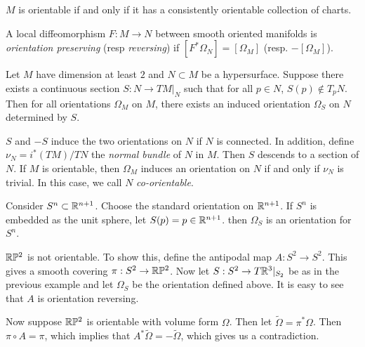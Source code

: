 \documentclass[twoside, 10pt]{article}
\begin{document}
    \begin{exer} $M$ is orientable if and only if it has a
    consistently orientable collection of charts.  \end{exer}

    \begin{defn} A local diffeomorphism $F:M \to N$ between smooth oriented
    manifolds is \textit{orientation preserving} (resp \textit{reversing}) if
$[F^*\Omega_N] = [\Omega_M]$ (resp. $-[\Omega_M]$).  \end{defn}

    \begin{prop} Let $M$ have dimension at least $2$ and $N \subset M$ be a
        hypersurface. Suppose there exists a continuous section $S: N \to
        TM|_N$ such that for all $p \in N$, $S(p) \notin T_pN$. Then for all
        orientations $\Omega_M$ on $M$, there exists an induced orientation
        $\Omega_S$ on $N$ determined by $S$.  \end{prop}

    \begin{rmk} $S$ and $-S$ induce the two orientations on $N$ if $N$ is
        connected. In addition, define $\nu_N = i^*(TM) / TN$ the
        \textit{normal bundle} of $N$ in $M$. Then $S$ descends to a section of
        $N$. If $M$ is orientable, then $\Omega_M$ induces an orientation on
        $N$ if and only if $\nu_N$ is trivial. In this case, we call $N$
        \textit{co-orientable}.  \end{rmk}

    \begin{exm} Consider $S^n \subset \mathbb{R}^{n+1}$. Choose the standard
    orientation on $\mathbb{R}^{n+1}$. If $S^n$ is embedded as the unit sphere, let
$S(p) = p \in \mathbb{R}^{n+1}$. then $\Omega_S$ is an orientation for $S^n$.
\end{exm}

    \begin{exm} $\mathbb{R}\mathbb{P}^2$ is not orientable. To show this, define the antipodal
        map $A: S^2 \to S^2$. This gives a smooth covering $\pi: S^2 \to
        \mathbb{R}\mathbb{P}^2$. Now let $S: S^2 \to T\mathbb{R}^3|_{S_2}$ be as in the previous
        example and let $\Omega_S$ be the orientation defined above. It is easy
        to see that $A$ is orientation reversing. 

        Now suppose $\mathbb{R}\mathbb{P}^2$ is orientable with volume form $\Omega$. Then let
    $\widetilde{\Omega} = \pi^*\Omega$. Then $\pi \circ A = \pi$, which implies
that $A^*\widetilde{\Omega} = - \widetilde{\Omega}$, which gives us a
contradiction.  \end{exm}
\end{document}
